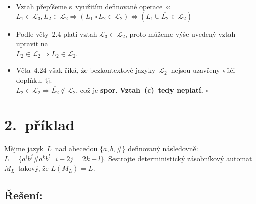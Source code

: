 \documentclass[a4paper, 11pt]{scrartcl}
\newcommand*{\QEDB}{\hfill\ensuremath{\square}}
\begin{document}
\begin{enumerate}[(a)]
\begin{itemize}
                \item
                    Vztah přepíšeme s~využitím definované operace~$ \circ $: \\
                    $ L_1 \in \mathcal{L}_3, L_2 \in \mathcal{L}_2 \Rightarrow
                    (L_1 \circ L_2 \in \mathcal{L}_2) \Leftrightarrow (L_1
                    \cup \overline{L_2} \in \mathcal{L}_2) $

                \item
                    Podle věty~2.4 platí vztah $ \mathcal{L}_3
                    \subset \mathcal{L}_2 $, proto můžeme výše uvedený vztah
                    upravit na \\ $ L_2 \in \mathcal{L}_2 \Rightarrow
                    \overline{L_2} \in \mathcal{L}_2 $.

                \item
                    Věta~4.24 však říká, že bezkontextové
                    jazyky~$ \mathcal{L}_2 $~nejsou uzavřeny vůči doplňku,
                    tj. \\ $ L_2 \in \mathcal{L}_2 \Rightarrow \overline{L_2}
                    \notin \mathcal{L}_2 $, což je \textbf{spor}.
                    \textbf{Vztah~(c)~tedy neplatí.} \QEDB
            \end{itemize}
    \end{enumerate}


    \section*{2.~příklad}

    Mějme jazyk~$ L $~nad abecedou $ \{a, b, \#\} $ definovaný následovně:
    $ L = \{a^ib^j\#a^kb^l\ |\ i + 2j = 2k + l\} $. Sestrojte deterministický
    zásobníkový automat~$ M_L $~takový, že $ L(M_L) = L $.

    \subsection*{Řešení:}
\end{document}
